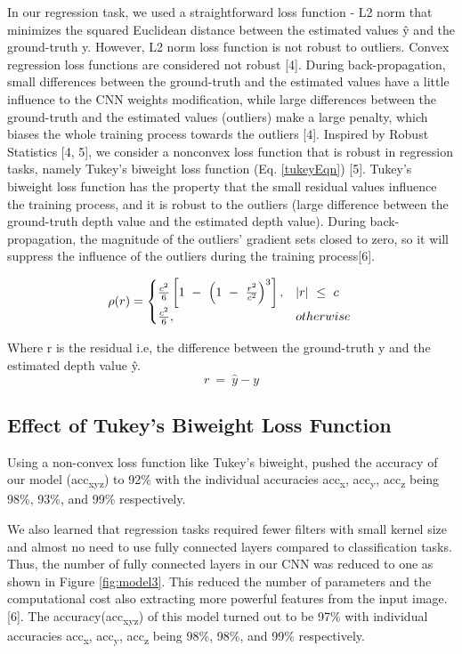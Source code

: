 \documentclass{article}
\begin{document}
In our regression task, we used a straightforward loss function - L2 norm that minimizes the squared Euclidean distance
between the estimated values ŷ and the ground-truth y. However, L2 norm loss function is not robust to outliers. Convex regression loss functions are considered not robust [4]. During back-propagation, small differences between the ground-truth and the estimated values have a little influence to the CNN weights modification, while large differences between the ground-truth and the estimated values (outliers)
make a large penalty, which biases the whole training process towards the outliers [4]. Inspired by Robust Statistics [4, 5], we consider a nonconvex loss function that is robust in regression tasks, namely
Tukey's biweight loss function (Eq. \ref{tukeyEqn}) [5]. Tukey's biweight loss function has the property that the small residual values influence the training process, and it is robust to the outliers (large difference between the ground-truth depth value and the estimated depth value). During back-propagation, the magnitude of the outliers’ gradient sets closed to zero, so it will suppress the influence of the outliers during the training process[6].

\begin{equation}
\label{tukeyEqn}
\rho(r)=
\begin{cases}
\frac{c^2}{6}\left[1\ -\ \left(1\ -\ \frac{r^2}{c^2}\right)^3 \right],  & \left|r\right|\ \le\ c \\
\frac{c^2}{6}, & otherwise \\
\end{cases}\\
\end{equation}

Where r is the residual i.e, the difference between the ground-truth y and the estimated depth value ŷ.
\begin{equation}
r\ = \ \hat{y} - y
\end{equation}

\subsection{Effect of Tukey's Biweight Loss Function}
Using a non-convex loss function like Tukey's biweight, pushed the accuracy of our model (acc\textsubscript{xyz}) to 92\% with the individual accuracies acc\textsubscript{x}, acc\textsubscript{y}, acc\textsubscript{z} being 98\%, 93\%, and 99\% respectively.

We also learned that regression tasks required fewer filters with small kernel size and almost no need to use fully connected layers compared to classification tasks. Thus, the number of fully connected layers in our CNN was reduced to one as shown in Figure \ref{fig:model3}. This reduced the number of parameters and the computational cost also extracting more powerful features from the input image. [6]. The accuracy(acc\textsubscript{xyz}) of this model turned out to be 97\% with individual accuracies acc\textsubscript{x}, acc\textsubscript{y}, acc\textsubscript{z} being 98\%, 98\%, and 99\% respectively.
\end{document}
